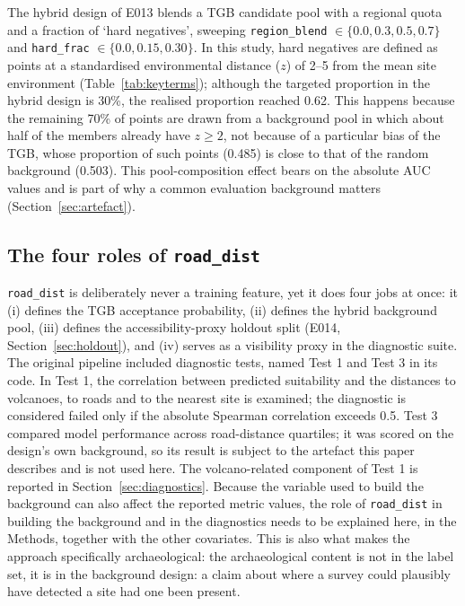 \documentclass[12pt]{article}
\begin{document}
The hybrid design of E013 blends a TGB candidate pool with a regional quota and a fraction of `hard negatives', sweeping \texttt{region\_blend} $\in \{0.0,0.3,0.5,0.7\}$ and \texttt{hard\_frac} $\in \{0.0,0.15,0.30\}$.
In this study, hard negatives are defined as points at a standardised environmental distance ($z$) of 2--5 from the mean site environment (Table~\ref{tab:keyterms}); although the targeted proportion in the hybrid design is 30\%, the realised proportion reached 0.62.
This happens because the remaining 70\% of points are drawn from a background pool in which about half of the members already have $z \geq 2$, not because of a particular bias of the TGB, whose proportion of such points (0.485) is close to that of the random background (0.503).
This pool-composition effect bears on the absolute AUC values and is part of why a common evaluation background matters (Section~\ref{sec:artefact}).

\subsection{The four roles of \texttt{road\_dist}}
\label{sec:fourroles}

\texttt{road\_dist} is deliberately never a training feature, yet it does four jobs at once: it (i) defines the TGB acceptance probability, (ii) defines the hybrid background pool, (iii) defines the accessibility-proxy holdout split (E014, Section~\ref{sec:holdout}), and (iv) serves as a visibility proxy in the diagnostic suite.
The original pipeline included diagnostic tests, named Test 1 and Test 3 in its code. In Test 1, the correlation between predicted suitability and the distances to volcanoes, to roads and to the nearest site is examined; the diagnostic is considered failed only if the absolute Spearman correlation exceeds 0.5.
Test 3 compared model performance across road-distance quartiles; it was scored on the design's own background, so its result is subject to the artefact this paper describes and is not used here. The volcano-related component of Test 1 is reported in Section~\ref{sec:diagnostics}.
Because the variable used to build the background can also affect the reported metric values, the role of \texttt{road\_dist} in building the background and in the diagnostics needs to be explained here, in the Methods, together with the other covariates.
This is also what makes the approach specifically archaeological: the archaeological content is not in the label set, it is in the background design: a claim about where a survey could plausibly have detected a site had one been present.
\end{document}
